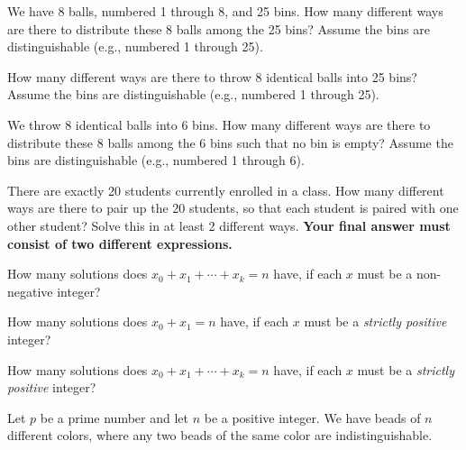 \documentclass[11pt]{article}
\begin{document}
\begin{Parts}
\Part We have 8 balls, numbered 1 through 8, and 25 bins.
  How many different ways are there to distribute these 8 balls among
  the 25 bins? Assume the bins are distinguishable (e.g., numbered 1
  through 25).
  
\Part How many different ways are there to throw 8 identical balls
  into 25 bins? Assume the bins are distinguishable (e.g., numbered 1
  through 25).
 
\Part We throw 8 identical balls into 6 bins.
  How many different ways are there to distribute these 8 balls among
  the 6 bins such that no bin is empty? Assume the bins are
  distinguishable (e.g., numbered 1 through 6). 

\Part There are exactly 20 students currently enrolled in a class.
  How many different ways are there to pair up the 20 students, so
  that each student is paired with one other student? Solve this in at least 2 different ways. \textbf{Your final answer must consist of two different expressions. }

  
\Part How many solutions does $x_0 + x_1 + \cdots + x_k = n$ have, if each $x$ must be a non-negative integer?

\Part How many solutions does $x_0 + x_1 = n$ have, if each $x$ must be a \emph{strictly positive} integer?

\Part How many solutions does $x_0 + x_1 + \cdots + x_k = n$ have, if each $x$ must be a \emph{strictly positive} integer?

\end{Parts}


Let $p$ be a prime number and let $n$ be a positive integer.
We have beads of
$n$ different colors, where any two beads of the same color are indistinguishable.
\end{document}
